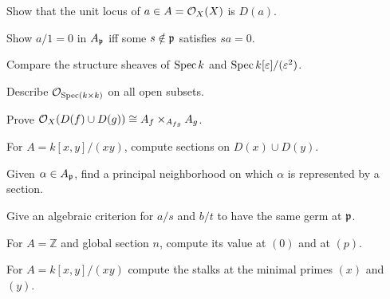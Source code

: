 \begin{exercise}\label{ex:vi17-12}
Show that the unit locus of $a\in A=\mathcal O_X(X)$ is $D(a)$.
\end{exercise}

\begin{exercise}\label{ex:vi17-13}
Show $a/1=0$ in $A_{\mathfrak p}$ iff some $s\notin\mathfrak p$ satisfies $sa=0$.
\end{exercise}

\begin{exercise}\label{ex:vi17-14}
Compare the structure sheaves of $\operatorname{Spec} k$ and $\operatorname{Spec} k[\varepsilon]/(\varepsilon^2)$.
\end{exercise}

\begin{exercise}\label{ex:vi17-15}
Describe $\mathcal O_{\operatorname{Spec}(k\times k)}$ on all open subsets.
\end{exercise}

\begin{exercise}\label{ex:vi17-16}
Prove $\mathcal O_X(D(f)\cup D(g))\cong A_f\times_{A_{fg}}A_g$.
\end{exercise}

\begin{exercise}\label{ex:vi17-17}
For $A=k[x,y]/(xy)$, compute sections on $D(x)\cup D(y)$.
\end{exercise}

\begin{exercise}\label{ex:vi17-18}
Given $\alpha\in A_{\mathfrak p}$, find a principal neighborhood on which $\alpha$ is represented by a section.
\end{exercise}

\begin{exercise}\label{ex:vi17-19}
Give an algebraic criterion for $a/s$ and $b/t$ to have the same germ at $\mathfrak p$.
\end{exercise}

\begin{exercise}\label{ex:vi17-20}
For $A=\mathbb Z$ and global section $n$, compute its value at $(0)$ and at $(p)$.
\end{exercise}

\begin{exercise}\label{ex:vi17-21}
For $A=k[x,y]/(xy)$ compute the stalks at the minimal primes $(x)$ and $(y)$.
\end{exercise}

